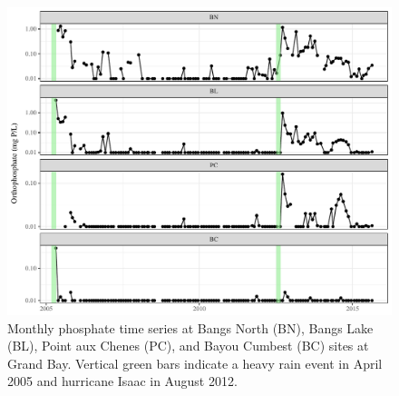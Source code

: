 \documentclass[letterpaper,12pt]{article}\usepackage[]{graphicx}\usepackage[]{color}
\makeatletter
\def\maxwidth{ %
  \ifdim\Gin@nat@width>\linewidth
    \linewidth
  \else
    \Gin@nat@width
  \fi
}
\makeatother
\begin{document}
\begin{figure}[!ht]

{\centering \includegraphics[width=\maxwidth]{figs/Fig4} 

}

\caption[Monthly phosphate time series at Bangs North (BN), Bangs Lake (BL), Point aux Chenes (PC), and Bayou Cumbest (BC) sites at Grand Bay]{Monthly phosphate time series at Bangs North (BN), Bangs Lake (BL), Point aux Chenes (PC), and Bayou Cumbest (BC) sites at Grand Bay. Vertical green bars indicate a heavy rain event in April 2005 and hurricane Isaac in August 2012.}\label{fig:Fig4}
\end{figure}


\clearpage
\end{document}
